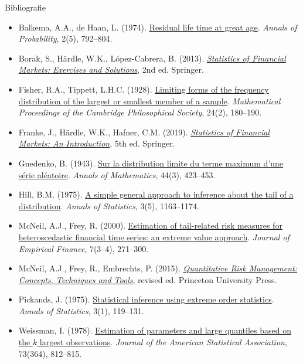 \begin{frame}{Bibliografie}
\itemsize{\tiny}
\begin{itemize}
    \item Balkema, A.A., de Haan, L. (1974). \href{https://doi.org/10.1214/aop/1176996548}{Residual life time at great age}. \textit{Annals of Probability}, 2(5), 792--804.
    \item Borak, S., Härdle, W.K., López-Cabrera, B. (2013). \href{https://doi.org/10.1007/978-3-642-33929-5}{\textit{Statistics of Financial Markets: Exercises and Solutions}}, 2nd ed. Springer.
    \item Fisher, R.A., Tippett, L.H.C. (1928). \href{https://doi.org/10.1017/S0305004100015681}{Limiting forms of the frequency distribution of the largest or smallest member of a sample}. \textit{Mathematical Proceedings of the Cambridge Philosophical Society}, 24(2), 180--190.
    \item Franke, J., Härdle, W.K., Hafner, C.M. (2019). \href{https://doi.org/10.1007/978-3-030-13751-9}{\textit{Statistics of Financial Markets: An Introduction}}, 5th ed. Springer.
    \item Gnedenko, B. (1943). \href{https://doi.org/10.2307/1968974}{Sur la distribution limite du terme maximum d'une série aléatoire}. \textit{Annals of Mathematics}, 44(3), 423--453.
    \item Hill, B.M. (1975). \href{https://doi.org/10.1214/aos/1176343247}{A simple general approach to inference about the tail of a distribution}. \textit{Annals of Statistics}, 3(5), 1163--1174.
    \item McNeil, A.J., Frey, R. (2000). \href{https://doi.org/10.1016/S0927-5398(00)00012-8}{Estimation of tail-related risk measures for heteroscedastic financial time series: an extreme value approach}. \textit{Journal of Empirical Finance}, 7(3--4), 271--300.
    \item McNeil, A.J., Frey, R., Embrechts, P. (2015). \href{https://press.princeton.edu/books/hardcover/9780691166278/quantitative-risk-management}{\textit{Quantitative Risk Management: Concepts, Techniques and Tools}}, revised ed. Princeton University Press.
    \item Pickands, J. (1975). \href{https://doi.org/10.1214/aos/1176343003}{Statistical inference using extreme order statistics}. \textit{Annals of Statistics}, 3(1), 119--131.
    \item Weissman, I. (1978). \href{https://doi.org/10.1080/01621459.1978.10480104}{Estimation of parameters and large quantiles based on the $k$ largest observations}. \textit{Journal of the American Statistical Association}, 73(364), 812--815.
\end{itemize}
\end{frame}


